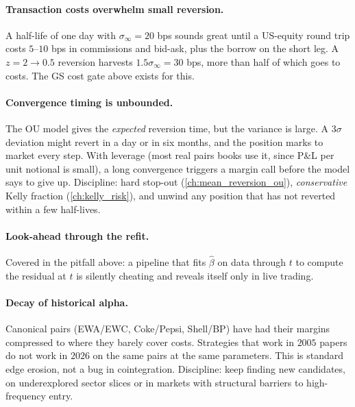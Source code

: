 \paragraph{Transaction costs overwhelm small reversion.} A
half-life of one day with $\sigma_\infty = 20$ bps sounds great
until a US-equity round trip costs $5$--$10$ bps in commissions
and bid-ask, plus the borrow on the short leg. A $z = 2 \to 0.5$
reversion harvests $1.5\sigma_\infty = 30$ bps, more than half of
which goes to costs. The GS cost gate above exists for this.

\paragraph{Convergence timing is unbounded.} The OU model gives
the \emph{expected} reversion time, but the variance is large. A
$3\sigma$ deviation might revert in a day or in six months, and
the position marks to market every step. With leverage (most
real pairs books use it, since P\&L per unit notional is small),
a long convergence triggers a margin call before the model says
to give up. Discipline: hard stop-out (\cref{ch:mean_reversion_ou}),
\emph{conservative} Kelly fraction (\cref{ch:kelly_risk}), and
unwind any position that has not reverted within a few half-lives.

\paragraph{Look-ahead through the refit.} Covered in the pitfall
above: a pipeline that fits $\hat\beta$ on data through $t$ to
compute the residual at $t$ is silently cheating and reveals
itself only in live trading.

\paragraph{Decay of historical alpha.} Canonical pairs (EWA/EWC,
Coke/Pepsi, Shell/BP) have had their margins compressed to where
they barely cover costs. Strategies that work in $2005$ papers do
not work in $2026$ on the same pairs at the same parameters. This
is standard edge erosion, not a bug in cointegration. Discipline: keep
finding new candidates, on underexplored sector slices or in
markets with structural barriers to high-frequency entry.

